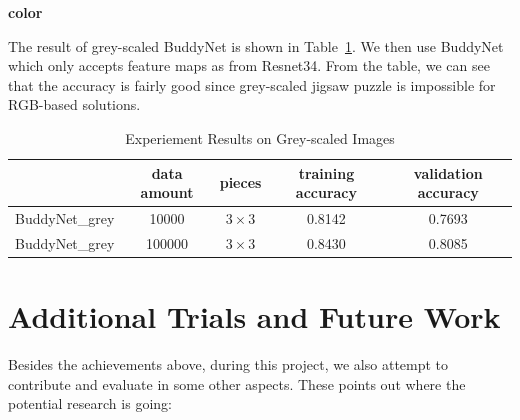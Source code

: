 \documentclass{article}
\begin{document}
\textbf{color}

The result of grey-scaled BuddyNet is shown in Table~\ref{tab:expgrey}. We then use BuddyNet which only accepts feature maps as from Resnet34. From the table, we can see that the accuracy is fairly good since grey-scaled jigsaw puzzle is impossible for RGB-based solutions.

\begin{table}
    \caption{Experiement Results on Grey-scaled Images}
    \centering
    \label{tab:expgrey}
    \begin{tabular}{c|c|c|c|c}
        \hline
        & data amount & pieces & training accuracy & validation accuracy\\
        \hline
        BuddyNet\_grey & 10000 & $3\times 3$ & 0.8142 & 0.7693\\
        \hline
        BuddyNet\_grey & 100000 & $3\times 3$ & 0.8430 & 0.8085\\
        \hline
    \end{tabular}
\end{table}

\section{Additional Trials and Future Work}

Besides the achievements above, during this project, we also attempt to contribute and evaluate in some other aspects. These points out where the potential research is going:
\end{document}
